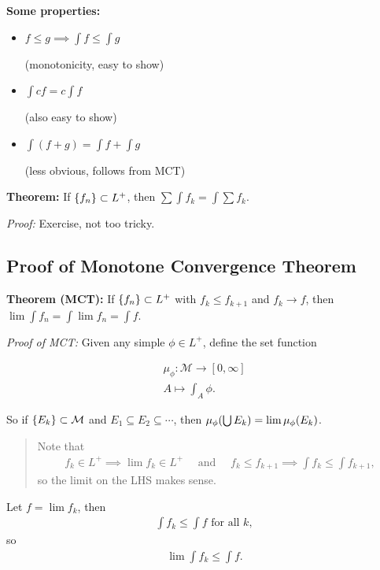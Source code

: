 \textbf{Some properties:}

\begin{itemize}
\item
  \(f\leq g \implies \int f \leq \int g\)

  (monotonicity, easy to show)
\item
  \(\int cf = c\int f\)

  (also easy to show)
\item
  \(\int (f + g) = \int f + \int g\)

  (less obvious, follows from MCT)
\end{itemize}

\textbf{Theorem:} If \(\left\{{f_n}\right\} \subset L^+\), then
\(\sum \int f_k = \int \sum f_k\).

\emph{Proof:} Exercise, not too tricky.

\hypertarget{proof-of-monotone-convergence-theorem}{%
\subsection{Proof of Monotone Convergence
Theorem}\label{proof-of-monotone-convergence-theorem}}

\textbf{Theorem (MCT):} If \(\left\{{f_n}\right\} \subset L^+\) with
\(f_k \leq f_{k+1}\) and \(f_k \to f\), then
\(\lim \int f_n = \int \lim f_n = \int f\).

\emph{Proof of MCT:} Given any simple \(\phi \in L^+\), define the set
function

\begin{align*}
\mu_\phi: \mathcal M \to [0, \infty] \\
A \mapsto \int_A \phi
.\end{align*}

So if \(\left\{{E_k}\right\} \subset \mathcal M\) and
\(E_1 \subseteq E_2 \subseteq \cdots\), then
\(\mu_\phi(\bigcup E_k) = \lim \mu_\phi(E_k)\).

\begin{quote}
Note that
\begin{align*}
f_k \in L^+ \implies \lim f_k \in L^+ \quad \text{ and }\quad  f_k \leq f_{k+1} \implies \int f_k \leq \int f_{k+1}
,\end{align*} so the limit on the LHS makes sense.
\end{quote}

Let \(f = \lim f_k\), then
\begin{align*}
\int f_k \leq \int f \text{ for all } k
,\end{align*} so
\begin{align*}
\lim \int f_k \leq \int f.\end{align*}

